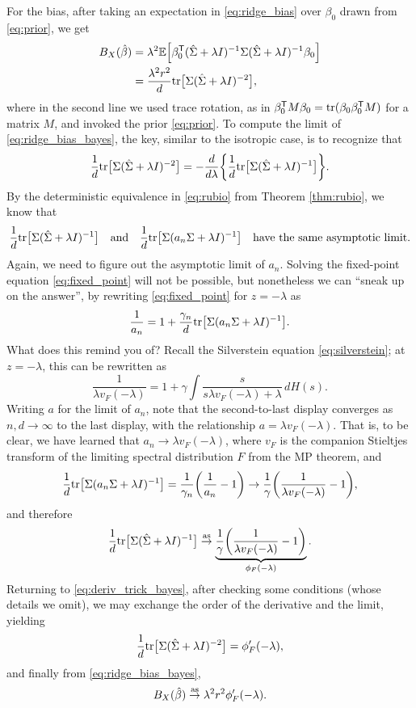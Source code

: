 \documentclass{article}
\begin{document}
For the bias, after taking an expectation in \eqref{eq:ridge_bias} over
$\beta_0$ drawn from \eqref{eq:prior}, we get
\begin{align}
\nonumber
B_X(\hat{\beta}) 
&= \lambda^2 \mathbb{E} \Big[ \beta_0^{\mathsf{T}} (\hat\Sigma + \lambda I)^{-1} \Sigma (\hat\Sigma + 
  \lambda I)^{-1} \beta_0 \Big] \\
\label{eq:ridge_bias_bayes}
&= \frac{\lambda^2 r^2}{d} \mathrm{tr} \big[ \Sigma (\hat\Sigma + \lambda I)^{-2} \big],
\end{align}
where in the second line we used trace rotation, as in $\beta_0^{\mathsf{T}} M \beta_0 = 
\mathrm{tr}(\beta_0 \beta_0^{\mathsf{T}} M)$ for a matrix $M$, and invoked the prior
\eqref{eq:prior}. To compute the limit of \eqref{eq:ridge_bias_bayes}, the key,
similar to the isotropic case, is to recognize that   
\begin{equation}
\label{eq:deriv_trick_bayes}
\frac{1}{d} \mathrm{tr} \big[ \Sigma (\hat\Sigma + \lambda I)^{-2} \big] = -
\frac{d}{d\lambda} \bigg \{ \frac{1}{d} \mathrm{tr} \big[ \Sigma (\hat\Sigma + \lambda  
I)^{-1} \big] \bigg\}.   
\end{equation}
By the deterministic equivalence in \eqref{eq:rubio} from Theorem
\ref{thm:rubio}, we know that
\[
\frac{1}{d} \mathrm{tr} \big[ \Sigma (\hat\Sigma + \lambda I)^{-1} \big] \quad \text{and}
\quad \frac{1}{d} \mathrm{tr} \big[\Sigma (a_n \Sigma + \lambda I)^{-1} \big] \quad
\text{have the same asymptotic limit}.
\]
Again, we need to figure out the asymptotic limit of $a_n$. Solving the
fixed-point equation \eqref{eq:fixed_point} will not be possible, but
nonetheless we can ``sneak up on the answer'', by rewriting
\eqref{eq:fixed_point} for $z = -\lambda$ as
\[
\frac{1}{a_n}  = 1 + \frac{\gamma_n}{d} \mathrm{tr} \big[ \Sigma (a_n \Sigma + \lambda 
I)^{-1} \big]. 
\]
What does this remind you of? Recall the Silverstein equation
\eqref{eq:silverstein}; at $z = -\lambda$, this can be rewritten as     
\[
\frac{1}{\lambda v_F(-\lambda)} = 1 + \gamma \int \frac{s}{s \lambda
  v_F(-\lambda) + \lambda} \, dH(s). 
\]
Writing $a$ for the limit of $a_n$, note that the second-to-last display
converges as $n,d \to \infty$ to the last display, with the relationship $a =
\lambda v_F(-\lambda)$. That is, to be clear, we have learned that $a_n \to
\lambda v_F(-\lambda)$, where $v_F$ is the companion Stieltjes transform of the
limiting spectral distribution $F$ from the MP theorem, and 
\[
\frac{1}{d} \mathrm{tr} \big[ \Sigma (a_n \Sigma + \lambda I)^{-1} \big] =
\frac{1}{\gamma_n} \bigg( \frac{1}{a_n} - 1 \bigg) \to \frac{1}{\gamma} 
\bigg( \frac{1}{\lambda v_F(-\lambda)} - 1 \bigg),
\]
and therefore 
\[
\frac{1}{d} \mathrm{tr} \big[ \Sigma (\hat\Sigma + \lambda I)^{-1} \big] \overset{\mathrm{as}}{\to}
\underbrace{\frac{1}{\gamma} \bigg( \frac{1}{\lambda v_F(-\lambda)} - 1   
  \bigg)}_{\phi_F(-\lambda)}. 
\]
Returning to \eqref{eq:deriv_trick_bayes}, after checking some conditions (whose 
details we omit), we may exchange the order of the derivative and the limit,
yielding  
\[
\frac{1}{d} \mathrm{tr} \big[ \Sigma (\hat\Sigma + \lambda I)^{-2} \big] =
\phi'_F(-\lambda),
\]
and finally from \eqref{eq:ridge_bias_bayes}, 
\begin{equation}
\label{eq:ridge_bias_bayes_limit}
B_X(\hat{\beta}) \overset{\mathrm{as}}{\to} \lambda^2 r^2 \phi'_F(-\lambda). 
\end{equation}
\end{document}
